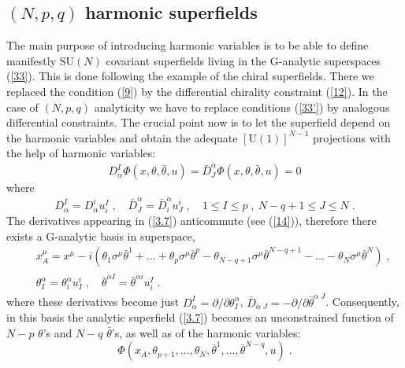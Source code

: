 \documentclass[a4paper,12pt]{article}
\begin{document}
\subsection{$(N,p,q)$ harmonic superfields}\label{npqhsf}

The main purpose of introducing harmonic variables is to be able 
to define manifestly $\mbox{SU}(N)$ covariant superfields living 
in the G-analytic superspaces (\ref{33}). This is done following 
the example of the chiral superfields. There we replaced the 
condition (\ref{9}) by the differential chirality constraint 
(\ref{12}). In the case of $(N,p,q)$ analyticity we have to 
replace conditions (\ref{33'}) by analogous differential 
constraints. The crucial point now is to let the superfield depend 
on the harmonic variables and obtain the adequate 
$[\mbox{U}(1)]^{N-1}$ projections with the help of harmonic 
variables: 
\begin{equation}\label{3.7}
 D^I_\alpha \Phi(x,\theta,\bar\theta,u) = 
\bar D^{\dot\alpha}_J\Phi(x,\theta,\bar\theta,u)=0 
\end{equation}
where
\begin{equation}\label{3.8}
D^I_\alpha = D^i_\alpha u_i^I\;, \quad \bar D^{\dot\alpha}_J = 
\bar D^{\dot\alpha}_i u^i_J\;, \quad 1\leq I \leq p\;, \  N-q+1 
\leq J \leq N \;. 
\end{equation}
The derivatives appearing in (\ref{3.7}) anticommute (see 
(\ref{14})), therefore there exists a G-analytic basis in 
superspace, 
\begin{eqnarray}
  &&x^\mu_A =  x^\mu 
-i(\theta_1\sigma^\mu \bar\theta^{1} + \ldots + \theta_p 
\sigma^\mu \bar\theta^{p} - \theta_{N-q+1} \sigma^\mu 
\bar\theta^{N-q+1}-\ldots - \theta_N \sigma^\mu  \bar\theta^{N} 
)\;,\nonumber\\ 
  &&\theta^\alpha_I = \theta^\alpha_i u^i_I\;, \quad 
\bar\theta^{\dot\alpha I} = \bar\theta^{\dot\alpha i} 
u_i^I\;.\label{3.9} 
\end{eqnarray} 
where these derivatives become just $D^I_\alpha = 
\partial/\partial\theta^\alpha_I$, $\bar D_{\dot\alpha\; J} = 
-\partial/\partial\bar\theta^{\dot\alpha\; J}$. Consequently, in 
this basis the analytic superfield (\ref{3.7}) becomes an 
unconstrained function of $N-p$ $\theta$'s and $N-q$ 
$\bar\theta$'s, as well as of the harmonic variables: 
\begin{equation}\label{3.10}
   \Phi(x_A,\theta_{p+1},\ldots,\theta_{N},
\bar\theta^1,\ldots,\bar\theta^{N-q}, u)\;. 
\end{equation} 
\end{document}
